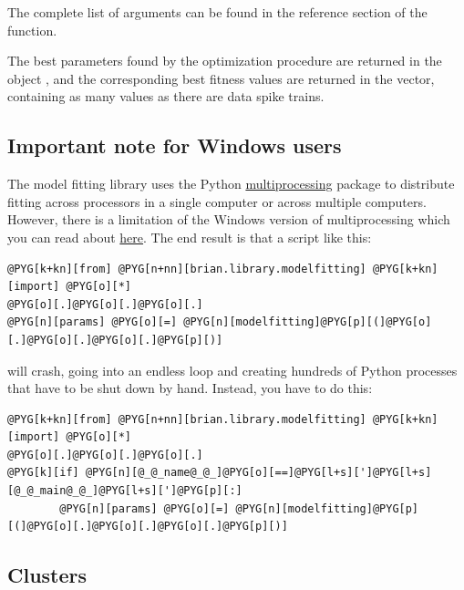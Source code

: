 \documentclass[letterpaper,10pt,english]{manual}
\begin{document}
The complete list of arguments can be found in the reference
section of the \hyperlink{brian.library.modelfitting.modelfitting}{} function.

The best parameters found by the optimization procedure are returned in the \hyperlink{brian.Parameters}{}
object , and the corresponding best fitness values are returned in the
 vector, containing as many values as there are data spike trains.
\hypertarget{note-for-windows-users}{}

\subsection{Important note for Windows users}

The model fitting library uses the Python \href{http://docs.python.org/library/multiprocessing.html}{multiprocessing}
package to distribute fitting across processors in a single computer or across
multiple computers. However, there is a limitation of the Windows version of
multiprocessing which you can read about \href{http://docs.python.org/library/multiprocessing.html\#windows}{here}.
The end result is that a script like this:

\begin{Verbatim}[commandchars=@\[\]]
@PYG[k+kn][from] @PYG[n+nn][brian.library.modelfitting] @PYG[k+kn][import] @PYG[o][*]
@PYG[o][.]@PYG[o][.]@PYG[o][.]
@PYG[n][params] @PYG[o][=] @PYG[n][modelfitting]@PYG[p][(]@PYG[o][.]@PYG[o][.]@PYG[o][.]@PYG[p][)]
\end{Verbatim}

will crash, going into an endless loop and creating hundreds of Python processes
that have to be shut down by hand. Instead, you have to do this:

\begin{Verbatim}[commandchars=@\[\]]
@PYG[k+kn][from] @PYG[n+nn][brian.library.modelfitting] @PYG[k+kn][import] @PYG[o][*]
@PYG[o][.]@PYG[o][.]@PYG[o][.]
@PYG[k][if] @PYG[n][@_@_name@_@_]@PYG[o][==]@PYG[l+s][']@PYG[l+s][@_@_main@_@_]@PYG[l+s][']@PYG[p][:]
        @PYG[n][params] @PYG[o][=] @PYG[n][modelfitting]@PYG[p][(]@PYG[o][.]@PYG[o][.]@PYG[o][.]@PYG[p][)]
\end{Verbatim}
\hypertarget{modelfitting-clusters}{}

\subsection{Clusters}
\end{document}
